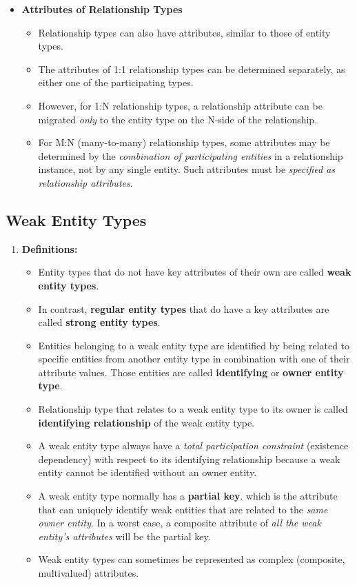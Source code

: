 \documentclass[10pt]{article}
\begin{document}
\begin{enumerate}
\begin{itemize}
		\item \textbf{Attributes of Relationship Types}
		\begin{itemize}
			\item Relationship types can also have attributes, similar to those of entity types.
			\item The attributes of 1:1 relationship types can be determined separately, as either one of the participating types.
			\item However, for 1:N relationship types, a relationship attribute can be migrated \textit{only} to the entity type on the N-side of the relationship.
			\item For M:N (many-to-many) relationship types, some attributes may be determined by the \textit{combination of participating entities} in a relationship instance, not by any single entity. Such attributes must be \textit{specified as relationship attributes}.
		\end{itemize}
	\end{itemize}
\end{enumerate}

\subsection{Weak Entity Types}
\begin{enumerate}
	\item \textbf{Definitions: }
	\begin{itemize}
		\item Entity types that do not have key attributes of their own are called \textbf{weak entity types}.
		\item In contrast, \textbf{regular entity types} that do have a key attributes are called \textbf{strong entity types}.
		\item Entities belonging to a weak entity type are identified by being related to specific entities from another entity type in combination with one of their attribute values. Those entities are called \textbf{identifying} or \textbf{owner entity type}.
		\item Relationship type that relates to a weak entity type to its owner is called \textbf{identifying relationship} of the weak entity type.
		\item A weak entity type always have a \textit{total participation constraint} (existence dependency) with respect to its identifying relationship because a weak entity cannot be identified without an owner entity.
		\item A weak entity type normally has a \textbf{partial key}. which is the attribute that can uniquely identify weak entities that are related to the \textit{same owner entity}. In a worst case, a composite attribute of \textit{all the weak entity's attributes} will be the partial key.
		\item Weak entity types can sometimes be represented as complex (composite, multivalued) attributes.
	\end{itemize}
\end{enumerate}
\end{document}
